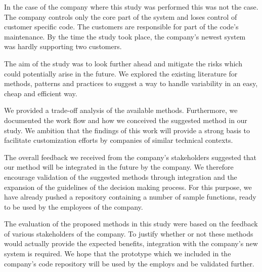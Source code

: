 In the case of the company where this study was performed this was not the case. The company controls only the core part of the system and loses control of customer specific code. The customers are responsible for part of the code's maintenance. By the time the study took place, the company's newest system was hardly supporting two customers.

The aim of the study was to look further ahead and mitigate the risks which could potentially arise in the future. We explored the existing literature for methods, patterns and practices to suggest a way to handle variability in an easy, cheap and efficient way. 

We provided a trade-off analysis of the available methods. Furthermore, we documented the work flow and how we conceived the suggested method in our study. We ambition that the findings of this work will provide a strong basis to facilitate customization efforts by companies of similar technical contexts. 

The overall feedback we received  from the company's stakeholders suggested that our method will be integrated in the future by the company. We therefore encourage validation of the suggested methods through integration and the expansion of the guidelines of the decision making process. For this purpose, we have already pushed a repository containing a number of sample functions, ready to be used by the employees of the company.

 








The evaluation of the proposed methods in this study were based on the feedback of various stakeholders of the company. To justify whether or not these methods would actually provide the expected benefits, integration with the company's new system is required. We hope that the prototype which we included in the company's code repository will be used by the employs and be validated further.



